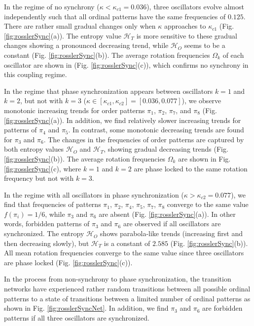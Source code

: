 In the regime of no synchrony ($\kappa < \kappa_{c1}=0.036$), three oscillators evolve almost independently such that all ordinal patterns have the same frequencies of $0.125$. There are rather small gradual changes only when $\kappa$ approaches to $\kappa_{c1}$ (Fig. \ref{fig:rosslerSync}(a)). The entropy value $\mathcal{H}_T$ is more sensitive to these gradual changes showing a pronounced decreasing trend, while $\mathcal{H}_O$ seems to be a constant (Fig. \ref{fig:rosslerSync}(b)). The average rotation frequencies $\Omega_k$ of each oscillator are shown in (Fig. \ref{fig:rosslerSync}(c)), which confirms no synchrony in this coupling regime.

In the regime that phase synchronization appears between oscillators $k=1$ and $k=2$, but not with $k=3$ ($\kappa \in [\kappa_{c1}, \kappa_{c2}] =[0.036, 0.077]$), we observe monotonic increasing trends for order patterns $\pi_1$, $\pi_2$, $\pi_7$, and $\pi_8$ (Fig. \ref{fig:rosslerSync}(a)). In addition, we find relatively slower increasing trends for patterns of $\pi_4$ and $\pi_5$. In contrast,  some monotonic decreasing trends are found for $\pi_3$ and $\pi_6$. The changes in the frequencies of order patterns are captured by both entropy values $\mathcal{H}_O$ and $\mathcal{H}_T$, showing gradual decreasing trends (Fig. \ref{fig:rosslerSync}(b)). The average rotation frequencies $\Omega_k$ are shown in Fig. \ref{fig:rosslerSync}(c), where $k=1$ and $k=2$ are phase locked to the same rotation frequency but not with $k=3$.

In the regime with all oscillators in phase synchronization ($\kappa > \kappa_{c2} = 0.077$), we find that frequencies of patterns $\pi_1$, $\pi_2$, $\pi_4$, $\pi_5$, $\pi_7$, $\pi_8$ converge to the same value $f(\pi_i) = 1/6$, while $\pi_3$ and $\pi_6$ are absent (Fig. \ref{fig:rosslerSync}(a)). In other words, forbidden patterns of $\pi_3$ and $\pi_6$ are observed if all oscillators are synchronized. The entropy $\mathcal{H}_O$ shows parabola-like trends (increasing first and then decreasing slowly), but $\mathcal{H}_T$ is a constant of $2.585$ (Fig. \ref{fig:rosslerSync}(b)). All mean rotation frequencies converge to the same value since three oscillators are phase locked (Fig. \ref{fig:rosslerSync}(c)).

In the process from non-synchrony to phase synchronization, the transition networks have experienced rather random transitions between all possible ordinal patterns to a state of transitions between a limited number of ordinal patterns as shown in Fig. \ref{fig:rosslerSyncNet}. In addition, we find $\pi_3$ and $\pi_6$ are forbidden patterns if all three oscillators are synchronized.



